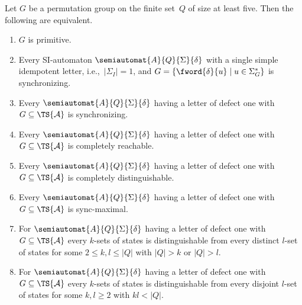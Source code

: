 \begin{theorem}
	\label{sync_max:thm:prim} 
	Let $G$ be a permutation group on the finite set~$Q$ of size at least five.
	Then the following are equivalent.
	\begin{enumerate}
		\item \label{sync_max:thm:prim:item:prim} $G$ is primitive. 
		
		\item  \label{sync_max:thm:prim:item:SI} Every SI-automaton $\semiautomat{A}{Q}{\Sigma}{\delta}$
		with a single simple idempotent letter, i.e.,~$|\Sigma_I| = 1$, and 
		$G = \{ \fword{\delta}{u} \mid u \in \Sigma_G^* \}$ is synchronizing. 
		
		\item  \label{sync_max:thm:prim:item:sync}  Every $\semiautomat{A}{Q}{\Sigma}{\delta}$ 
		having a letter of defect one with $G \subseteq \TS{\mathcal A}$ is synchronizing.
		
		\item  \label{sync_max:thm:prim:item:cr}  Every $\semiautomat{A}{Q}{\Sigma}{\delta}$ having
		a letter of defect one with $G \subseteq \TS{\mathcal A}$ is completely reachable.
		
		\item  \label{sync_max:thm:prim:item:cd}  Every $\semiautomat{A}{Q}{\Sigma}{\delta}$ having
		a letter of defect one
		with $G \subseteq \TS{\mathcal A}$ is completely distinguishable.
		
		\item  \label{sync_max:thm:prim:item:sm}  Every $\semiautomat{A}{Q}{\Sigma}{\delta}$ having
		a letter of defect one
		with $G \subseteq \TS{\mathcal A}$ is sync-maximal.	
		
		\item  \label{sync_max:thm:prim:item:ksets} For $\semiautomat{A}{Q}{\Sigma}{\delta}$ having
		a letter of defect one
		with $G \subseteq \TS{\mathcal A}$ every $k$-sets of states is distinguishable from every distinct $l$-set of states for some $2 \le k, l \le|Q|$ with $|Q| > k$ or $|Q| > l$.
			
		\item  \label{sync_max:thm:prim:item:klsets} For $\semiautomat{A}{Q}{\Sigma}{\delta}$ having
		a letter of defect one
		with $G \subseteq \TS{\mathcal A}$ every $k$-sets of states is distinguishable from every disjoint $l$-set of states for some $k, l \ge 2$
		with $kl < |Q|$.
	\end{enumerate} 
\end{theorem} 
